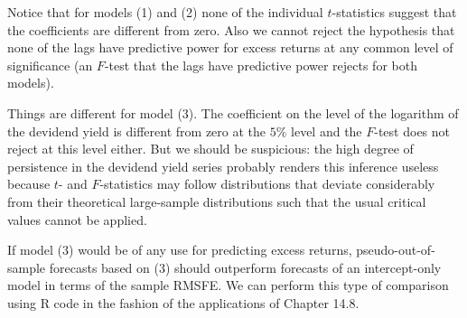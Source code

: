 \documentclass[]{book}
\theoremstyle{definition}
\theoremstyle{definition}
\theoremstyle{definition}
\theoremstyle{remark}
\begin{document}
Notice that for models (1) and (2) none of the individual
\(t\)-statistics suggest that the coefficients are different from zero.
Also we cannot reject the hypothesis that none of the lags have
predictive power for excess returns at any common level of significance
(an \(F\)-test that the lags have predictive power rejects for both
models).

Things are different for model (3). The coefficient on the level of the
logarithm of the devidend yield is different from zero at the \(5\%\)
level and the \(F\)-test does not reject at this level either. But we
should be suspicious: the high degree of persistence in the devidend
yield series probably renders this inference useless because \(t\)- and
\(F\)-statistics may follow distributions that deviate considerably from
their theoretical large-sample distributions such that the usual
critical values cannot be applied.

If model (3) would be of any use for predicting excess returns,
pseudo-out-of-sample forecasts based on (3) should outperform forecasts
of an intercept-only model in terms of the sample RMSFE. We can perform
this type of comparison using R code in the fashion of the applications
of Chapter 14.8.
\end{document}

